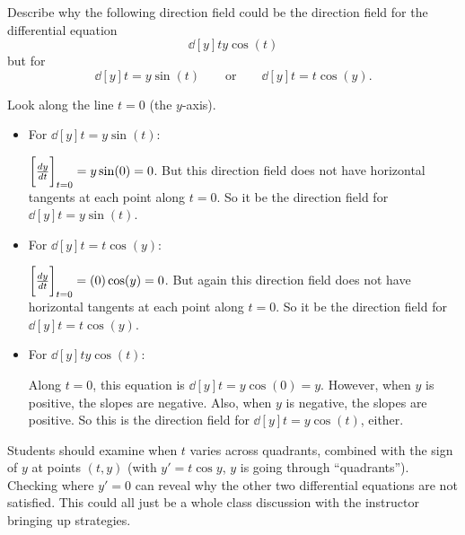 \documentclass[]{ximera}
\begin{document}
\begin{problem}
Describe why the following direction field could be the direction field for the differential equation 
	\[
	\dd[y]{t} y \cos(t)
	\]
but  for 
	\[
	\dd[y]{t} = y \sin(t) 	\qquad	\text{or}	\qquad	\dd[y]{t} = t \cos(y).
	\]
	
	\begin{freeResponse}
		
	Look along the line $t=0$ (the $y$-axis).
	
	\begin{itemize}
	
	\item  For $\dd[y]{t} = y \sin(t)$:
	
	$\eval{\dd[y]{t}}_{t=0} = y \sin(0) = 0$.  
	But this direction field does not have horizontal tangents at each point along $t=0$.  
	So it  be the direction field for $\dd[y]{t} = y \sin(t)$.
	
	\item  For $\dd[y]{t} = t \cos(y)$:
	
	$\eval{\dd[y]{t}}_{t=0} = (0) \cos(y) = 0$.  
	But again this direction field does not have horizontal tangents at each point along $t=0$.  
	So it  be the direction field for $\dd[y]{t} = t \cos(y)$.
	
	\item  For $\dd[y]{t} y \cos(t)$:
	
	Along $t=0$, this equation is $\dd[y]{t} = y \cos(0) = y$.  
	However, when $y$ is positive, the slopes are negative.  
	Also, when $y$ is negative, the slopes are positive.  
	So this is  the direction field for $\dd[y]{t} = y \cos(t)$, either.
	
	\end{itemize}
	\end{freeResponse}
		
\end{problem}

\begin{instructorNotes}
Students should examine when $t$ varies across quadrants, combined with the sign of $y$ at points $(t,y)$ (with $y'=t \cos y$, $y$ is going through ``quadrants'').  Checking where $y'=0$ can reveal why the other two differential equations are not satisfied.  
This could all just be a whole class discussion with the instructor bringing up strategies.
\end{instructorNotes}
\end{document}
